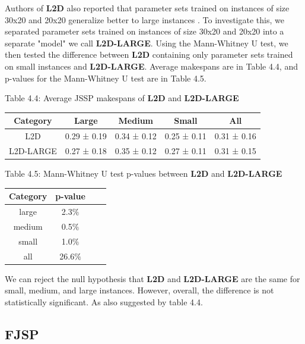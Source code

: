 Authors of \textbf{L2D} also reported that parameter sets trained on instances of size 30x20 and 20x20 generalize better to large instances \cite{zhang2020learning}. To investigate this, we separated parameter sets trained on instances of size 30x20 and 20x20 into a separate "model" we call \textbf{L2D-LARGE}. Using the Mann-Whitney U test, we then tested the difference between \textbf{L2D} containing only parameter sets trained on small instances and \textbf{L2D-LARGE}. Average makespans are in Table 4.4, and p-values for the Mann-Whitney U test are in Table 4.5.

\begin{table}
    Table 4.4: Average JSSP makespans of \textbf{L2D} and \textbf{L2D-LARGE}\\
    \vspace{1mm}
\begin{tabular}{ccccc}
    \toprule
    Category & Large & Medium & Small & All \\
    \midrule
    L2D & 0.29 ± 0.19 & 0.34 ± 0.12 & 0.25 ± 0.11 & 0.31 ± 0.16 \\
    L2D-LARGE & 0.27 ± 0.18 & 0.35 ± 0.12 & 0.27 ± 0.11 & 0.31 ± 0.15 \\
    \bottomrule
    \end{tabular}
\end{table}

\begin{table}
    Table 4.5: Mann-Whitney U test p-values between \textbf{L2D} and \textbf{L2D-LARGE}\\
    \begin{tabular}{cccc}
        \toprule
        Category & p-value \\
        \midrule
        large & 2.3$\%$ \\
        medium & 0.5$\%$ \\
        small & 1.0$\%$ \\
        all & 26.6$\%$ \\
        \bottomrule
    \end{tabular}
\end{table}

We can reject the null hypothesis that \textbf{L2D} and \textbf{L2D-LARGE} are the same for small, medium, and large instances. However, overall, the difference is not statistically significant. As also suggested by table 4.4.

\subsection{FJSP} \label{results_fjsp}


